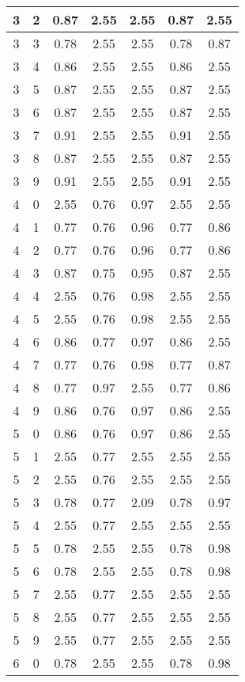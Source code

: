 \begin{longtable}{|c|c||c||c|c||c|c|}
	3 & 2 & 0.87 & 2.55 & 2.55 & 0.87 & 2.55 \\ \hline
	3 & 3 & 0.78 & 2.55 & 2.55 & 0.78 & 0.87 \\ \hline
	3 & 4 & 0.86 & 2.55 & 2.55 & 0.86 & 2.55 \\ \hline
	3 & 5 & 0.87 & 2.55 & 2.55 & 0.87 & 2.55 \\ \hline
	3 & 6 & 0.87 & 2.55 & 2.55 & 0.87 & 2.55 \\ \hline
	3 & 7 & 0.91 & 2.55 & 2.55 & 0.91 & 2.55 \\ \hline
	3 & 8 & 0.87 & 2.55 & 2.55 & 0.87 & 2.55 \\ \hline
	3 & 9 & 0.91 & 2.55 & 2.55 & 0.91 & 2.55 \\ \hline
	4 & 0 & 2.55 & 0.76 & 0.97 & 2.55 & 2.55 \\ \hline
	4 & 1 & 0.77 & 0.76 & 0.96 & 0.77 & 0.86 \\ \hline
	4 & 2 & 0.77 & 0.76 & 0.96 & 0.77 & 0.86 \\ \hline
	4 & 3 & 0.87 & 0.75 & 0.95 & 0.87 & 2.55 \\ \hline
	4 & 4 & 2.55 & 0.76 & 0.98 & 2.55 & 2.55 \\ \hline
	4 & 5 & 2.55 & 0.76 & 0.98 & 2.55 & 2.55 \\ \hline
	4 & 6 & 0.86 & 0.77 & 0.97 & 0.86 & 2.55 \\ \hline
	4 & 7 & 0.77 & 0.76 & 0.98 & 0.77 & 0.87 \\ \hline
	4 & 8 & 0.77 & 0.97 & 2.55 & 0.77 & 0.86 \\ \hline
	4 & 9 & 0.86 & 0.76 & 0.97 & 0.86 & 2.55 \\ \hline
	5 & 0 & 0.86 & 0.76 & 0.97 & 0.86 & 2.55 \\ \hline
	5 & 1 & 2.55 & 0.77 & 2.55 & 2.55 & 2.55 \\ \hline
	5 & 2 & 2.55 & 0.76 & 2.55 & 2.55 & 2.55 \\ \hline
	5 & 3 & 0.78 & 0.77 & 2.09 & 0.78 & 0.97 \\ \hline
	5 & 4 & 2.55 & 0.77 & 2.55 & 2.55 & 2.55 \\ \hline
	5 & 5 & 0.78 & 2.55 & 2.55 & 0.78 & 0.98 \\ \hline
	5 & 6 & 0.78 & 2.55 & 2.55 & 0.78 & 0.98 \\ \hline
	5 & 7 & 2.55 & 0.77 & 2.55 & 2.55 & 2.55 \\ \hline
	5 & 8 & 2.55 & 0.77 & 2.55 & 2.55 & 2.55 \\ \hline
	5 & 9 & 2.55 & 0.77 & 2.55 & 2.55 & 2.55 \\ \hline
	6 & 0 & 0.78 & 2.55 & 2.55 & 0.78 & 0.98 \\ \hline

\end{longtable}
